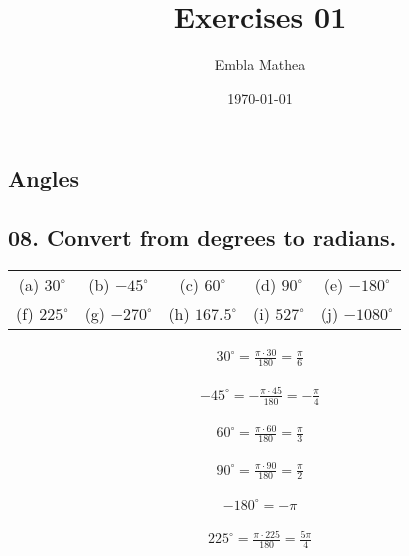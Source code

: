 \documentclass[12pt, a4paper]{article}
\title{Exercises 01}
\author{Embla Mathea}
\date{\today}
\begin{document}
\maketitle

\begin{center}
\section*{Angles}
\end{center}

\subsection*{08. Convert from degrees to radians.}

\begin{center}

\begin{tabular}{ c c c c c }
 (a) $30^\circ$ & (b) $-45^\circ$ & (c) $60^\circ$
 & (d) $90^\circ$ & (e) $-180^\circ$ \\  
 
 (f) $225^\circ$ & (g) $-270^\circ$ & (h) $167.5^\circ$
 & (i) $527^\circ$ & (j) $-1080^\circ$  
\end{tabular}

\end{center}

\begin{align}
	\tag{a}
	30^\circ = \frac{\pi\cdot30}{180} = \frac{\pi}{6}
\end{align}

\begin{align}
	\tag{b}
	-45^\circ = -\frac{\pi\cdot45}{180} = -\frac{\pi}{4}
\end{align}

\begin{align}
	\tag{c}
	60^\circ = \frac{\pi\cdot60}{180} = \frac{\pi}{3}
\end{align}

\begin{align}
	\tag{d}
	90^\circ = \frac{\pi\cdot90}{180} = \frac{\pi}{2}
\end{align}

\begin{align}
	\tag{e}
	-180^\circ = -\pi
\end{align}

\begin{align}
	\tag{f}
	225^\circ = \frac{\pi\cdot225}{180} = \frac{5\pi}{4}
\end{align}
\end{document}
